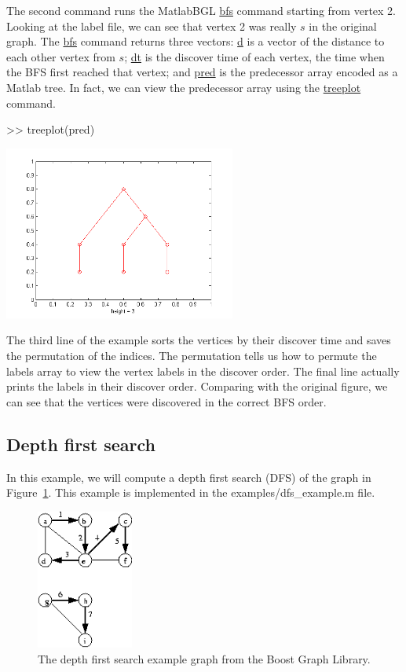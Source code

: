 \documentclass[12pt]{article}
\newcommand{\mycmd}[1]{\url{#1}}
\newcommand{\mypath}[1]{{\ttfamily \small #1}}
\begin{document}
The second command runs the MatlabBGL \mycmd{bfs} command starting from vertex 2.  Looking at the label file, we can see that vertex 2 was really $s$ in the original graph.  The \mycmd{bfs} command returns three vectors: \mycmd{d} is a vector of the distance to each other vertex from $s$; \mycmd{dt} is the discover time of each vertex, the time when the BFS first reached that vertex; and \mycmd{pred} is the predecessor array encoded as a Matlab tree.  In fact, we can view the predecessor array using the \mycmd{treeplot} command.

\begin{mcode}
>> treeplot(pred)
\end{mcode}
\begin{center}
\includegraphics[width=3in]{bfs_treeplot}
\end{center}

The third line of the example sorts the vertices by their discover time and saves the permutation of the indices.  The permutation tells us how to permute the labels array to view the vertex labels in the discover order.  The final line actually prints the labels in their discover order.  Comparing with the original figure, we can see that the vertices were discovered in the correct BFS order.

\subsection{Depth first search}

In this example, we will compute a depth first search (DFS) of the graph in Figure~\ref{fig:dfs}.  This example is implemented in the \mypath{examples/dfs\_example.m} file.

\begin{figure}[ht!]
\centering
\includegraphics[width=1.25in]{dfs}
\caption{The depth first search example graph from the Boost Graph Library.}
\label{fig:dfs}
\end{figure}
\end{document}
